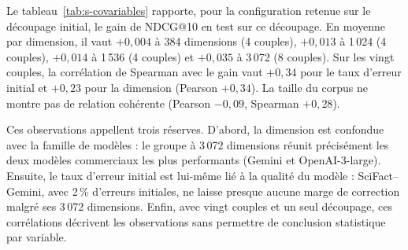 \documentclass[a4paper,10pt]{article}
\begin{document}
Le tableau~\ref{tab:s-covariables} rapporte, pour la configuration retenue sur le découpage initial, le gain de NDCG@10 en test sur ce découpage. En moyenne par dimension, il vaut $+0{,}004$ à 384 dimensions (4 couples), $+0{,}013$ à 1\,024 (4 couples), $+0{,}014$ à 1\,536 (4 couples) et $+0{,}035$ à 3\,072 (8 couples). Sur les vingt couples, la corrélation de Spearman avec le gain vaut $+0{,}34$ pour le taux d'erreur initial et $+0{,}23$ pour la dimension (Pearson $+0{,}34$). La taille du corpus ne montre pas de relation cohérente (Pearson $-0{,}09$, Spearman $+0{,}28$).

Ces observations appellent trois réserves. D'abord, la dimension est confondue avec la famille de modèles : le groupe à 3\,072 dimensions réunit précisément les deux modèles commerciaux les plus performants (Gemini et OpenAI-3-large). Ensuite, le taux d'erreur initial est lui-même lié à la qualité du modèle : SciFact--Gemini, avec 2\,\% d'erreurs initiales, ne laisse presque aucune marge de correction malgré ses 3\,072 dimensions. Enfin, avec vingt couples et un seul découpage, ces corrélations décrivent les observations sans permettre de conclusion statistique par variable.
\end{document}
